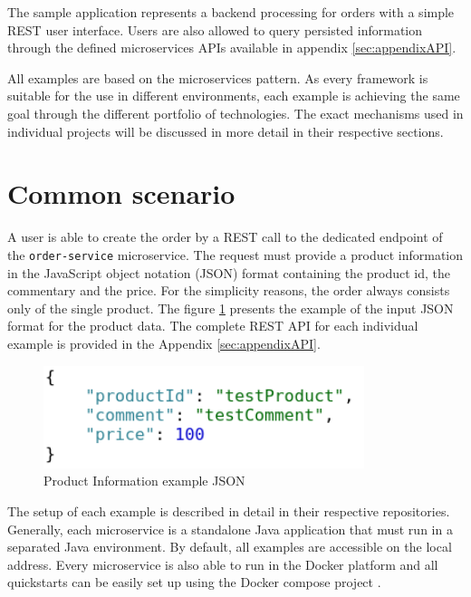 \documentclass[oneside,
  digital, %
  table,   %
  lof,     %
  lot,     %
]{fithesis3}
\begin{document}
The sample application represents a backend processing for orders with a simple REST user interface. Users are also allowed to query persisted information through the defined microservices APIs available in appendix \ref{sec:appendixAPI}.

All examples are based on the microservices pattern. As every framework is suitable for the use in different environments, each example is achieving the same goal through the different portfolio of technologies. The exact mechanisms used in individual projects will be discussed in more detail in their respective sections.

\section{Common scenario}

A user is able to create the order by a REST call to the dedicated endpoint of the \texttt{order-service} microservice. The request must provide a product information in the JavaScript object notation (JSON) format containing the product id, the commentary and the price. For the simplicity reasons, the order always consists only of the single product. The figure \ref{fig:inputJson} presents the example of the input JSON format for the product data. The complete REST API for each individual example is provided in the Appendix \ref{sec:appendixAPI}.

\begin{figure}
    \begin{center}
        \includegraphics[height=30mm]{images/productInfoJSON.png}
    \end{center}
    \caption{Product Information example JSON}
    \label{fig:inputJson}
\end{figure}

The setup of each example is described in detail in their respective repositories. Generally, each microservice is a standalone Java application that must run in a separated Java environment. By default, all examples are accessible on the local address. Every microservice is also able to run in the Docker \cite{docker} platform and all quickstarts can be easily set up using the Docker compose project \cite{docker_compose}.
\end{document}
